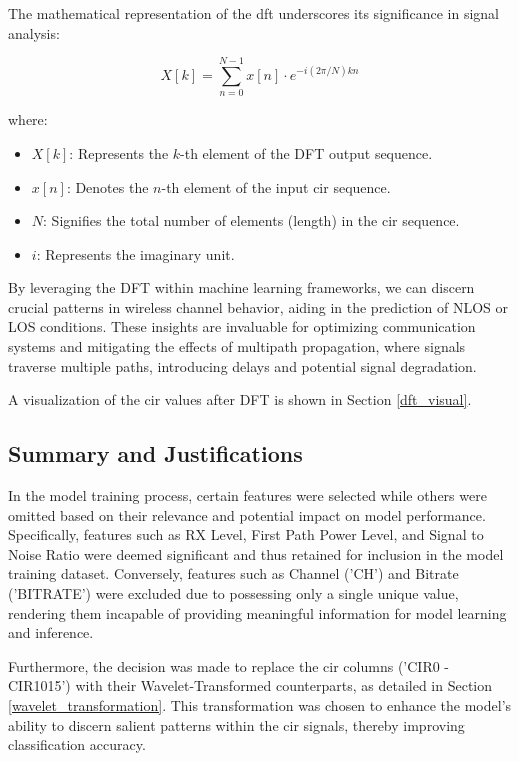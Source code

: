 The mathematical representation of the \acrshort{dft} underscores its significance in signal analysis:

\begin{equation}
X[k] = \sum_{n=0}^{N-1} x[n] \cdot e^{-i(2\pi/N)kn}
\end{equation}

where:
\begin{itemize}
    \item $X[k]$: Represents the $k$-th element of the DFT output sequence.
    \item $x[n]$: Denotes the $n$-th element of the input \acrshort{cir} sequence.
    \item $N$: Signifies the total number of elements (length) in the \acrshort{cir} sequence.
    \item $i$: Represents the imaginary unit.
\end{itemize}

By leveraging the DFT within machine learning frameworks, we can discern crucial patterns in wireless channel behavior, aiding in the prediction of NLOS or LOS conditions. These insights are invaluable for optimizing communication systems and mitigating the effects of multipath propagation, where signals traverse multiple paths, introducing delays and potential signal degradation.

A visualization of the \acrshort{cir} values after DFT is shown in Section \ref{dft_visual}.

\subsection{Summary and Justifications}

In the model training process, certain features were selected while others were omitted based on their relevance and potential impact on model performance. Specifically, features such as RX Level, First Path Power Level, and Signal to Noise Ratio were deemed significant and thus retained for inclusion in the model training dataset. Conversely, features such as Channel ('CH') and Bitrate ('BITRATE') were excluded due to possessing only a single unique value, rendering them incapable of providing meaningful information for model learning and inference.

Furthermore, the decision was made to replace the \acrshort{cir} columns ('CIR0 - CIR1015') with their Wavelet-Transformed counterparts, as detailed in Section \ref{wavelet_transformation}. This transformation was chosen to enhance the model's ability to discern salient patterns within the \acrshort{cir} signals, thereby improving classification accuracy.

